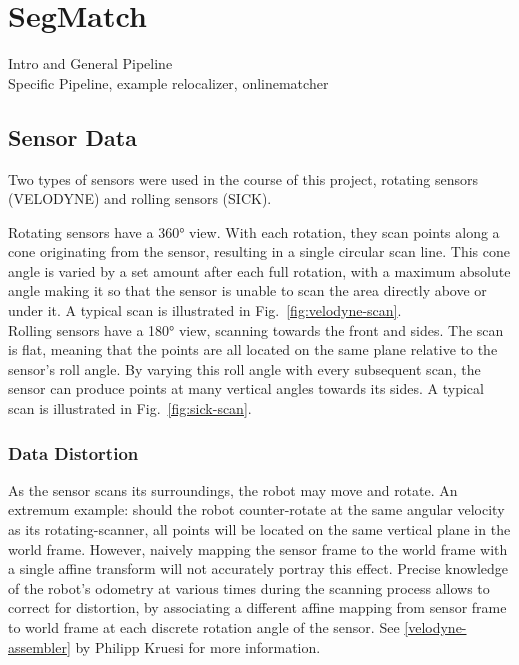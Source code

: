 \chapter{SegMatch}
\label{sec:segmatch}

Intro and General Pipeline\\

Specific Pipeline, example relocalizer, onlinematcher\\

\section{Sensor Data}
\label{sec:sensordata}

Two types of sensors were used in the course of this project, rotating sensors (VELODYNE) and rolling sensors (SICK). 

Rotating sensors have a 360° view. With each rotation, they scan points along a cone originating from the sensor, resulting in a single circular scan line. This cone angle is varied by a set amount after each full rotation, with a maximum absolute angle making it so that the sensor is unable to scan the area directly above or under it. A typical scan is illustrated in Fig.~\ref{fig:velodyne-scan}.\\ %

Rolling sensors have a 180° view, scanning towards the front and sides. The scan is flat, meaning that the points are all located on the same plane relative to the sensor’s roll angle. By varying this roll angle with every subsequent scan, the sensor can produce points at many vertical angles towards its sides. A typical scan is illustrated in Fig.~\ref{fig:sick-scan}.\\ %

\subsection{Data Distortion}
\label{subsec:distortion}

As the sensor scans its surroundings, the robot may move and rotate. An extremum example: should the robot counter-rotate at the same angular velocity as its rotating-scanner, all points will be located on the same vertical plane in the world frame. However, naively mapping the sensor frame to the world frame with a single affine transform will not accurately portray this effect. Precise knowledge of the robot’s odometry at various times during the scanning process allows to correct for distortion, by associating a different affine mapping from sensor frame to world frame at each discrete rotation angle of the sensor. See \ref{velodyne-assembler} by Philipp Kruesi for more information.\\ %

